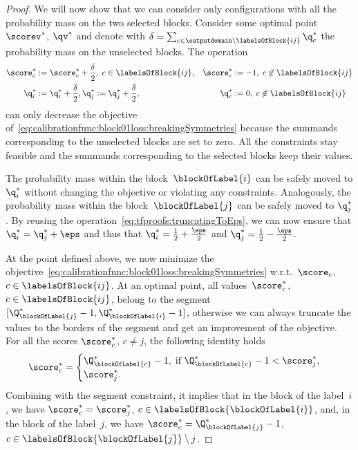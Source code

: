 \documentclass{article}
\begin{document}
\begin{proof}
    We will now show that we can consider only configurations with all the probability mass on the two selected blocks.
    Consider some optimal point $\scorev^*$, $\qv^*$ and denote with $\delta = \sum_{c\in \outputdomain \setminus \labelsOfBlock{ij}} \q_c^*$ the probability mass on the unselected blocks.
    The operation
    \begin{align*}
    \score_c^* &:= \score_c^* + \frac{\delta}{2}, \; c \in \labelsOfBlock{ij},& 
    \score_c^* &:= -1, \; c\not\in \labelsOfBlock{ij} \\
    \q_i^* &:= \q_i^* + \frac{\delta}{2}, 
    \q_{j}^* := \q_{j}^* + \frac{\delta}{2}, &
    \q_c^* &:= 0, \; c\not\in \labelsOfBlock{ij} 
    \end{align*}
    can only decrease the objective of~\eqref{eq:calibrationfunc:block01loss:breakingSymmetries} because the summands corresponding to the unselected blocks are set to zero.
    All the constraints stay feasible and the summands corresponding to the selected blocks keep their values.
    
    The probability mass within the block~$\blockOfLabel{i}$ can be safely moved to $\q_i^*$ without changing the objective or violating any constraints.
    Analogously, the probability mass within the block~$\blockOfLabel{j}$ can be safely moved to $\q_j^*$.
    By reusing the operation~\eqref{eq:tfproofs:truncatingToEps}, we can now ensure that $\q^*_i = \q^*_j + \eps$ and thus that $\q^*_i = \frac{1}{2} + \frac{\eps}{2}$ and $\q^*_{j} = \frac{1}{2} - \frac{\eps}{2}$.

    At the point defined above, we now minimize the objective~\eqref{eq:calibrationfunc:block01loss:breakingSymmetries} w.r.t.\ $\score_c$, $c \in \labelsOfBlock{ij}$.
    At an optimal point, all values~$\score_c^*$, $c \in \labelsOfBlock{ij}$, belong to the segment $[\Q_{\blockOfLabel{j}}^* - 1, \Q_{\blockOfLabel{i}}^* - 1]$, otherwise we can always truncate the values to the borders of the segment and get an improvement of the objective.
    For all the scores $\score_c^*$, $c \neq j$, the following identity holds
    \begin{equation}
    \label{eq:calibrationfunc:block01loss:scoreInSelBlocks}
    \score_c^* = \begin{cases}
    \Q_{\blockOfLabel{c}}^* - 1, \; \text{if $\Q_{\blockOfLabel{c}}^* - 1 < \score_{j}^*$}, \\
    \score_{j}^*.
    \end{cases}
    \end{equation}
    Combining with the segment constraint, it implies that in the block of the label~$i$, we have $\score_c^* = \score_{j}^*$, $c \in \labelsOfBlock{\blockOfLabel{i}}$, and, in the block of the label~$j$, we have $\score_c^* = \Q_{\blockOfLabel{j}}^* - 1$, $c \in \labelsOfBlock{\blockOfLabel{j}} \setminus j$.
    

\end{proof}
\end{document}
